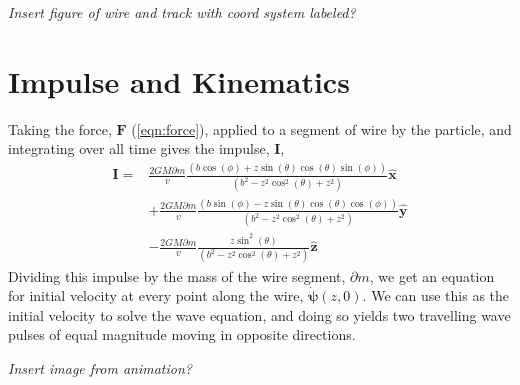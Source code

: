 \documentclass{report}
\begin{document}
\emph{Insert figure of wire and track with coord system labeled?}
\section*{Impulse and Kinematics}
Taking the force, $\mathbf{F}$ (\ref{eqn:force}), applied to a segment of wire by the particle, and integrating over all time gives the impulse, $\mathbf{I}$,
\begin{align}
    \nonumber\mathbf{I}= & \frac{2 G M \partial m}{v} \frac{(b \cos (\phi )+z \sin (\theta ) \cos (\theta ) \sin (\phi ))}{\left(b^2-z^2 \cos ^2(\theta )+z^2\right)} \mathbf{\hat x}\\
    \nonumber            & +\frac{2 G M \partial m}{v} \frac{(b \sin (\phi )-z \sin (\theta ) \cos (\theta ) \cos (\phi ))}{\left(b^2-z^2 \cos ^2(\theta )+z^2\right)} \mathbf{\hat y}\\
                         &  -\frac{2 G M \partial m}{v} \frac{z \sin ^2(\theta )}{\left(b^2-z^2 \cos ^2(\theta )+z^2\right)} \mathbf{\hat z}
    \label{eqn:impulse}
\end{align}
Dividing this impulse by the mass of the wire segment, $\partial m$, we get an equation for initial velocity at every point along the wire, $\mathbf{\dot\psi} (z, 0)$. 
We can use this as the initial velocity to solve the wave equation, and doing so yields two travelling wave pulses of equal magnitude moving in opposite directions.

\emph{Insert image from animation?}
\end{document}
